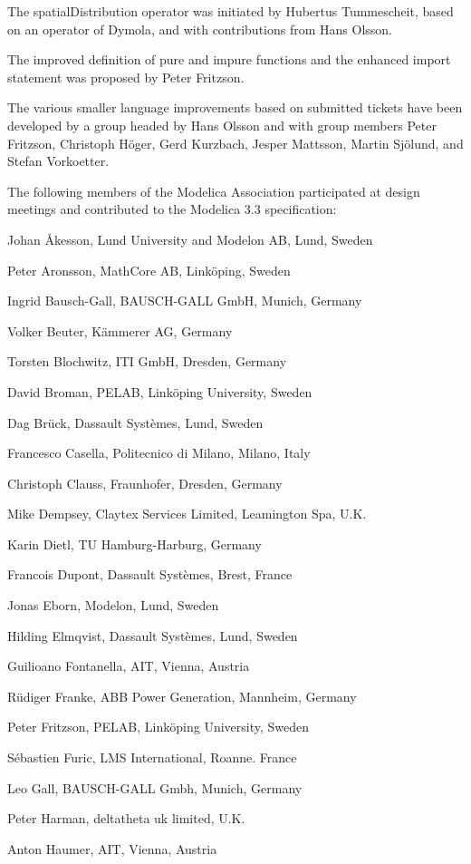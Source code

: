 The spatialDistribution operator was initiated by Hubertus Tummescheit,
based on an operator of Dymola, and with contributions from Hans Olsson.

The improved definition of pure and impure functions and the enhanced
import statement was proposed by Peter Fritzson.

The various smaller language improvements based on submitted tickets
have been developed by a group headed by Hans Olsson and with group
members Peter Fritzson, Christoph Höger, Gerd Kurzbach, Jesper Mattsson,
Martin Sjölund, and Stefan Vorkoetter.

The following members of the Modelica Association participated at design
meetings and contributed to the Modelica 3.3 specification:

Johan Åkesson, Lund University and Modelon AB, Lund, Sweden

Peter Aronsson, MathCore AB, Linköping, Sweden

Ingrid Bausch-Gall, BAUSCH-GALL GmbH, Munich, Germany

Volker Beuter, Kämmerer AG, Germany

Torsten Blochwitz, ITI GmbH, Dresden, Germany

David Broman, PELAB, Linköping University, Sweden

Dag Brück, Dassault Systèmes, Lund, Sweden

Francesco Casella, Politecnico di Milano, Milano, Italy

Christoph Clauss, Fraunhofer, Dresden, Germany

Mike Dempsey, Claytex Services Limited, Leamington Spa, U.K.

Karin Dietl, TU Hamburg-Harburg, Germany

Francois Dupont, Dassault Systèmes, Brest, France

Jonas Eborn, Modelon, Lund, Sweden

Hilding Elmqvist, Dassault Systèmes, Lund, Sweden

Guilioano Fontanella, AIT, Vienna, Austria

Rüdiger Franke, ABB Power Generation, Mannheim, Germany

Peter Fritzson, PELAB, Linköping University, Sweden

Sébastien Furic, LMS International, Roanne. France

Leo Gall, BAUSCH-GALL Gmbh, Munich, Germany

Peter Harman, deltatheta uk limited, U.K.

Anton Haumer, AIT, Vienna, Austria

